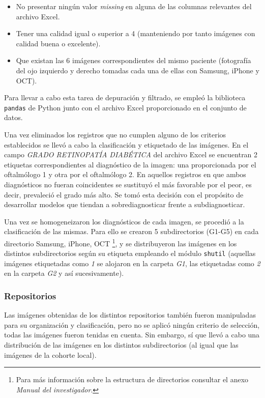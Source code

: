 \begin{itemize}
    \item No presentar ningún valor \textit{missing} en alguna de las columnas relevantes del archivo Excel.
    \item Tener una calidad igual o superior a 4 (manteniendo por tanto imágenes con calidad buena o excelente).
    \item Que existan las 6 imágenes correspondientes del mismo paciente (fotografía del ojo izquierdo y derecho tomadas cada una de ellas con Samsung, iPhone y OCT).
\end{itemize}

Para llevar a cabo esta tarea de depuración y filtrado, se empleó la biblioteca \texttt{pandas} de Python junto con el archivo Excel proporcionado en el conjunto de datos.

Una vez eliminados los registros que no cumplen alguno de los criterios establecidos se llevó a cabo la clasificación y etiquetado de las imágenes. En el campo \textit{GRADO RETINOPATÍA DIABÉTICA} del archivo Excel se encuentran 2 etiquetas correspondientes al diagnóstico de la imagen: una proporcionada por el oftalmólogo 1 y otra por el oftalmólogo 2. En aquellos registros en que ambos diagnósticos no fueran coincidentes se sustituyó el más favorable por el peor, es decir, prevaleció el grado más alto. Se tomó esta decisión con el propósito de desarrollar modelos que tiendan a sobrediagnosticar frente a subdiagnosticar. 

Una vez se homogeneizaron los diagnósticos de cada imagen, se procedió a la clasificación de las mismas. Para ello se crearon 5 subdirectorios (G1-G5) en cada directorio Samsung, iPhone, OCT \footnote{Para más información sobre la estructura de directorios consultar el anexo \textit{Manual del investigador}.}, y se distribuyeron las imágenes en los distintos subdirectorios según su etiqueta empleando el módulo \texttt{shutil} (aquellas imágenes etiquetadas como \textit{1} se alojaron en la carpeta \textit{G1}, las etiquetadas como \textit{2} en la carpeta \textit{G2} y así sucesivamente).

\subsubsection{Repositorios}

Las imágenes obtenidas de los distintos repositorios también fueron manipuladas para su organización y clasificación, pero no se aplicó ningún criterio de selección, todas las imágenes fueron tenidas en cuenta. Sin embargo, sí que llevó a cabo una distribución de las imágenes en los distintos subdirectorios (al igual que las imágenes de la cohorte local).

